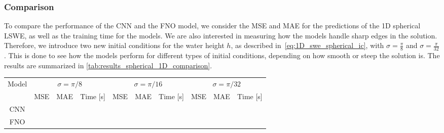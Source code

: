 \subsubsection*{Comparison}
To compare the performance of the CNN and the FNO model, we consider the MSE and MAE for the predictions of the 1D spherical LSWE, as well as the training time for the models.
We are also interested in measuring how the models handle sharp edges in the solution.
Therefore, we introduce two new initial conditions for the water height $h$, as described in~\eqref{eq:1D_swe_spherical_ic}, with $\sigma = \frac{\pi}{8}$ and $\sigma = \frac{\pi}{32}$.
This is done to see how the models perform for different types of initial conditions, depending on how smooth or steep the solution is.
The results are summarized in \autoref{tab:results_spherical_1D_comparison}.
\begin{table}[H]
    \centering
    \small %
    \begin{tabular}{c|ccc|ccc|ccc}
        \hline
        Model & \multicolumn{3}{c|}{$\sigma = \pi/8$} & \multicolumn{3}{c|}{$\sigma = \pi/16$} & \multicolumn{3}{c}{$\sigma = \pi/32$} \\
        \cline{2-10}
        & MSE & MAE & Time [s] & MSE & MAE & Time [s] & MSE & MAE & Time [s] \\
        \hline
        CNN & 
         &
         &
         &
         &
         &
         &
         &
         &
         
        \\ 
        \hline
        FNO & 
         &
         &

\end{tabular}
\end{table}
